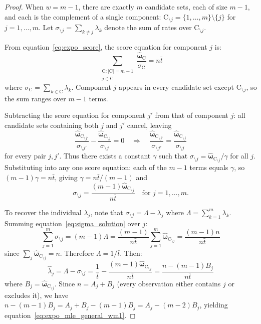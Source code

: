 \documentclass[pdflatex,sn-mathphys-num,Numbered]{sn-jnl}
\newcommand{\RV}[1]{\mathrm{#1}}
\newcommand{\cand}{\RV{C}}         %
\newcommand{\estimator}[1]{\hat{#1}}   %
\newcommand{\cntsymb}{\boldsymbol{\hat\omega}}
\theoremstyle{thmstyleone}
\theoremstyle{thmstylethree}
\theoremstyle{thmstyletwo}
\begin{document}
\begin{proof}
When $w = m-1$, there are exactly $m$ candidate sets, each of size $m-1$, and each is the complement of a single component: $\cand_{\setminus j} = \{1,\ldots,m\} \setminus \{j\}$ for $j = 1, \ldots, m$. Let $\sigma_{\setminus j} = \sum_{k \neq j} \lambda_k$ denote the sum of rates over $\cand_{\setminus j}$.

From equation~\eqref{eq:expo_score}, the score equation for component $j$ is:
\begin{equation}
\label{eq:score_general}
\sum_{\substack{\cand : |\cand| = m-1 \\ j \in \cand}} \frac{\cntsymb_{\cand}}{\sigma_{\cand}} = n\bar{t}
\end{equation}
where $\sigma_{\cand} = \sum_{k \in \cand} \lambda_k$. Component $j$ appears in every candidate set except $\cand_{\setminus j}$, so the sum ranges over $m-1$ terms.

Subtracting the score equation for component $j'$ from that of component $j$: all candidate sets containing both $j$ and $j'$ cancel, leaving
\begin{equation}
\frac{\cntsymb_{\cand_{\setminus j'}}}{\sigma_{\setminus j'}} - \frac{\cntsymb_{\cand_{\setminus j}}}{\sigma_{\setminus j}} = 0 \quad \Rightarrow \quad \frac{\cntsymb_{\cand_{\setminus j'}}}{\sigma_{\setminus j'}} = \frac{\cntsymb_{\cand_{\setminus j}}}{\sigma_{\setminus j}}
\end{equation}
for every pair $j, j'$. Thus there exists a constant $\gamma$ such that $\sigma_{\setminus j} = \cntsymb_{\cand_{\setminus j}} / \gamma$ for all $j$. Substituting into any one score equation: each of the $m-1$ terms equals $\gamma$, so $(m-1)\gamma = n\bar{t}$, giving $\gamma = n\bar{t}/(m-1)$ and
\begin{equation}
\label{eq:sigma_solution}
\sigma_{\setminus j} = \frac{(m-1)\cntsymb_{\cand_{\setminus j}}}{n\bar{t}} \quad \text{for } j = 1, \ldots, m.
\end{equation}

To recover the individual $\lambda_j$, note that $\sigma_{\setminus j} = \Lambda - \lambda_j$ where $\Lambda = \sum_{k=1}^m \lambda_k$. Summing equation~\eqref{eq:sigma_solution} over $j$:
\begin{equation}
\sum_{j=1}^m \sigma_{\setminus j} = (m-1)\Lambda = \frac{(m-1)}{n\bar{t}} \sum_{j=1}^m \cntsymb_{\cand_{\setminus j}} = \frac{(m-1)n}{n\bar{t}}
\end{equation}
since $\sum_j \cntsymb_{\cand_{\setminus j}} = n$. Therefore $\Lambda = 1/\bar{t}$. Then:
\begin{equation}
\estimator{\lambda}_j = \Lambda - \sigma_{\setminus j} = \frac{1}{\bar{t}} - \frac{(m-1)\cntsymb_{\cand_{\setminus j}}}{n\bar{t}} = \frac{n - (m-1)B_j}{n\bar{t}}
\end{equation}
where $B_j = \cntsymb_{\cand_{\setminus j}}$. Since $n = A_j + B_j$ (every observation either contains $j$ or excludes it), we have $n - (m-1)B_j = A_j + B_j - (m-1)B_j = A_j - (m-2)B_j$, yielding equation~\eqref{eq:expo_mle_general_wm1}.
\end{proof}
\end{document}
